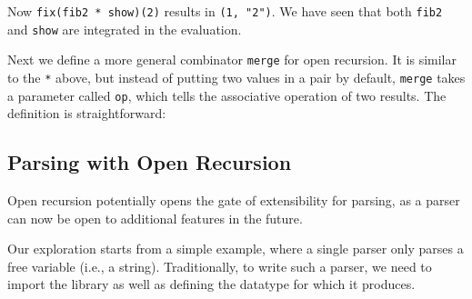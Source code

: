 Now \lstinline{fix(fib2 * show)(2)} results in \lstinline{(1, "2")}. We have seen that both \lstinline{fib2} and \lstinline{show} are integrated in the evaluation.

Next we define a more general combinator \lstinline{merge} for open recursion. It is similar to the \lstinline{*} above, but instead of putting two values in a pair by default, \lstinline{merge} takes a parameter called \lstinline{op}, which tells the associative operation of two results. The definition is straightforward:



\subsection{Parsing with Open Recursion}\label{subsec:parsingwithopen}

Open recursion potentially opens the gate of extensibility for
parsing, as a parser can now be open to additional features in the future.


Our exploration starts from a simple example, where a single parser only parses a free variable (i.e., a string). Traditionally, to write
such a parser, we need to import the library as
well as defining the datatype for which it produces.


